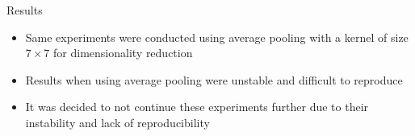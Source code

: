 
\begin{frame}{Results}
    \begin{itemize}
        \item Same experiments were conducted using average pooling with a kernel of size $7 \times 7$ for dimensionality reduction
        \item Results when using average pooling were unstable and difficult to reproduce
        \item It was decided to not continue these experiments further due to their instability and lack of reproducibility
    \end{itemize}
\end{frame}

